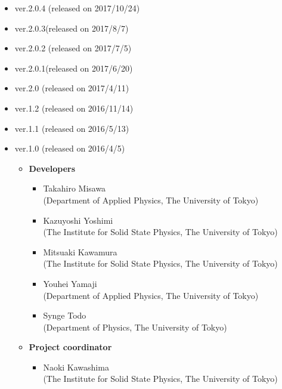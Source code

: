 \begin{itemize}
\item{ver.2.0.4 (released on 2017/10/24)}
\item{ver.2.0.3(released on 2017/8/7)}
\item{ver.2.0.2 (released on 2017/7/5)}
\item{ver.2.0.1(released on 2017/6/20)}
\item{ver.2.0 (released on 2017/4/11)}
\item{ver.1.2 (released on 2016/11/14)}
\item{ver.1.1 (released on 2016/5/13)}
\item{ver.1.0 (released on 2016/4/5)}
\begin{itemize}
	\item{\bf Developers}
	\begin{itemize}
	\item{Takahiro Misawa \\(Department of Applied Physics, The University of Tokyo)}
	\item{Kazuyoshi Yoshimi\\ (The Institute for Solid State Physics, The University of Tokyo)}
	\item{Mitsuaki Kawamura\\ (The Institute for Solid State Physics, The University of Tokyo)}
	\item{Youhei Yamaji\\ (Department of Applied Physics, The University of Tokyo)}
	\item{Synge Todo\\ (Department of Physics, The University of Tokyo)}
	\end{itemize}
	\item{\bf Project coordinator}
	\begin{itemize}
	\item{Naoki Kawashima\\ (The Institute for Solid State Physics, The University of Tokyo)}
	\end{itemize}
\end{itemize}


\end{itemize}
